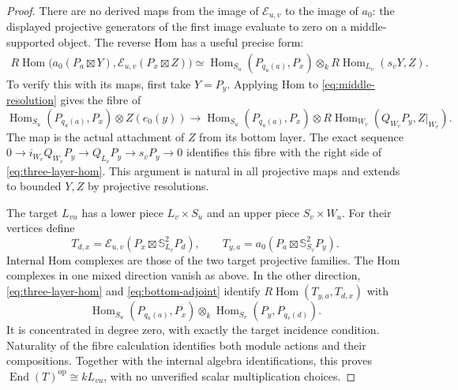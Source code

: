 \documentclass[11pt]{article}
\theoremstyle{definition}
\newcommand{\Hom}{\operatorname{Hom}}
\newcommand{\End}{\operatorname{End}}
\begin{document}
\begin{proof}
There are no derived maps from the image of $\mathcal E_{u,v}$
to the image of $a_0$: the displayed projective generators of the
first image evaluate to zero on a middle-supported object.
The reverse Hom has a useful precise form:
\begin{equation}\label{eq:three-layer-hom}
 \begin{split}
 R\Hom\bigl(a_0(P_a\boxtimes Y),
               \mathcal E_{u,v}(P_x\boxtimes Z)\bigr)
 \simeq \Hom_{S_u}(P_{q_u(a)},P_x)
                         \otimes_k R\Hom_{L_v}(s_vY,Z).
 \end{split}
\end{equation}
To verify this with its maps, first take $Y=P_y$.
Applying Hom to \eqref{eq:middle-resolution} gives the fibre of
\[
 \Hom_{S_u}(P_{q_u(a)},P_x)\otimes Z(e_0(y))
 \longrightarrow
 \Hom_{S_u}(P_{q_u(a)},P_x)\otimes
                 R\Hom_{W_v}(Q_{W_v}P_y,Z|_{W_v}).
\]
The map is the actual attachment of $Z$ from its bottom layer.
The exact sequence
$0\to i_{W_v}Q_{W_v}P_y\to Q_{L_v}P_y\to s_vP_y\to0$
identifies this fibre with the right side of
\eqref{eq:three-layer-hom}. This argument is natural in all
projective maps and extends to bounded $Y,Z$ by projective
resolutions.

The target $L_{vu}$ has a lower piece $L_v\times S_u$ and an
upper piece $S_v\times W_u$. For their vertices define
\[
 T_{d,x}=\mathcal E_{u,v}
                 (P_x\boxtimes\mathbb S_{L_v}^2P_d),\qquad
 T_{y,a}=a_0(P_a\boxtimes\mathbb S_{S_v}^2P_y).
\]
Internal Hom complexes are those of the two target projective
families. The Hom complexes in one mixed direction vanish as
above. In the other direction,
\eqref{eq:three-layer-hom} and \eqref{eq:bottom-adjoint} identify
$R\Hom(T_{y,a},T_{d,x})$ with
\[
 \Hom_{S_u}(P_{q_u(a)},P_x)\otimes_k
                              \Hom_{S_v}(P_y,P_{q_v(d)}).
\]
It is concentrated in degree zero, with exactly the target
incidence condition. Naturality of the fibre calculation identifies
both module actions and their compositions. Together with the
internal algebra identifications, this proves
$\End(T)^{\mathrm{op}}\cong kL_{vu}$, with no unverified scalar
multiplication choices.


\end{proof}
\end{document}
